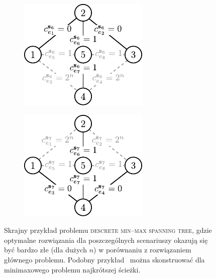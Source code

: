 \begin{figure}[!htbp]
	\null\hfill
	\begin{subfigure}[b]{0.3\textwidth}
		\includegraphics[width=\textwidth]{Chapter_II/MIN-MAX-DESC3-example/a}
		\caption{}
		\label{fig:minmaxexample2:a}
	\end{subfigure}
	\hfill
	\begin{subfigure}[b]{0.3\textwidth}
		\includegraphics[width=\textwidth]{Chapter_II/MIN-MAX-DESC3-example/b}
		\caption{}
		\label{fig:minmaxexample2:b}
	\end{subfigure}
	\hfill\null
	\caption{
		Skrajny przykład problemu \textsc{descrete min--max spanning tree}, gdzie optymalne rozwiązania dla poszczególnych scenariuszy okazują się być bardzo złe (dla dużych $n$) w porównaniu z rozwiązaniem głównego problemu. Podobny przykład~\cite[$429$--$430$]{minmaxSurvey} można skonstruować dla minimaxowego problemu najkrótszej ścieżki.
	}
	\label{fig:minmaxexample2}
\end{figure}


